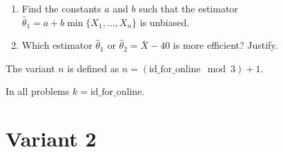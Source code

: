 \documentclass[12pt]{article}
\newcommand \id {\mathrm{id}\_\mathrm{for}\_\mathrm{online}}
\begin{document}
\begin{enumerate}
\begin{enumerate}
\item Find the constants  $a$ and $b$ such that the estimator  $\hat \theta_1 = a + b\min\{X_1, \ldots, X_n\}$ is unbiased.
\item Which estimator $\hat \theta_1$ or $\hat \theta_2 = \bar X - 40$ is more efficient? Justify.
\end{enumerate}

\end{enumerate}

\newpage

The variant $n$ is defined as $n=(\id \mod 3)+1$. 

In all problems $k=\id$.

\section*{Variant 2}
\end{document}
